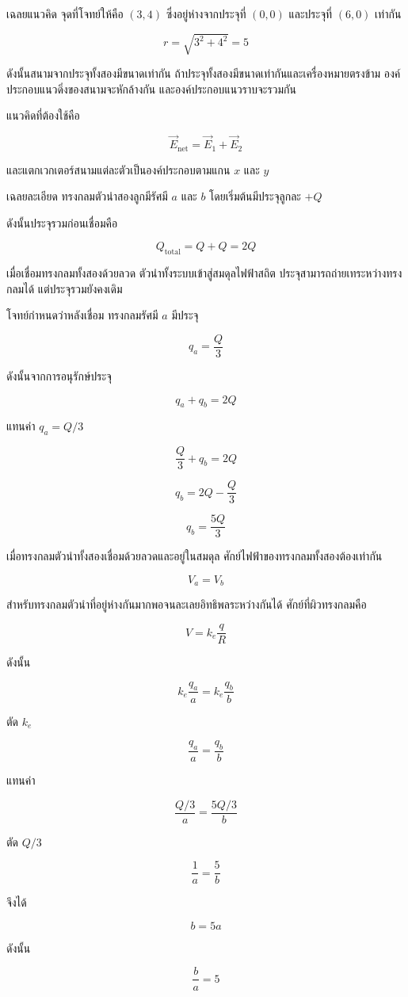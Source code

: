 \begin{examplebox}{เฉลยแนวคิด}
จุดที่โจทย์ให้คือ $(3,4)$ ซึ่งอยู่ห่างจากประจุที่ $(0,0)$ และประจุที่ $(6,0)$ เท่ากัน

\[
r=\sqrt{3^2+4^2}=5
\]

ดังนั้นสนามจากประจุทั้งสองมีขนาดเท่ากัน ถ้าประจุทั้งสองมีขนาดเท่ากันและเครื่องหมายตรงข้าม องค์ประกอบแนวดิ่งของสนามจะหักล้างกัน และองค์ประกอบแนวราบจะรวมกัน

แนวคิดที่ต้องใช้คือ

\[
\vec{E}_{\text{net}}=\vec{E}_1+\vec{E}_2
\]

และแตกเวกเตอร์สนามแต่ละตัวเป็นองค์ประกอบตามแกน $x$ และ $y$
\end{examplebox}

\begin{examplebox}{เฉลยละเอียด}
ทรงกลมตัวนำสองลูกมีรัศมี $a$ และ $b$ โดยเริ่มต้นมีประจุลูกละ $+Q$

ดังนั้นประจุรวมก่อนเชื่อมคือ

\[
Q_{\text{total}}=Q+Q=2Q
\]

เมื่อเชื่อมทรงกลมทั้งสองด้วยลวด ตัวนำทั้งระบบเข้าสู่สมดุลไฟฟ้าสถิต ประจุสามารถถ่ายเทระหว่างทรงกลมได้ แต่ประจุรวมยังคงเดิม

โจทย์กำหนดว่าหลังเชื่อม ทรงกลมรัศมี $a$ มีประจุ

\[
q_a=\frac{Q}{3}
\]

ดังนั้นจากการอนุรักษ์ประจุ

\[
q_a+q_b=2Q
\]

แทนค่า $q_a=Q/3$

\[
\frac{Q}{3}+q_b=2Q
\]

\[
q_b=2Q-\frac{Q}{3}
\]

\[
q_b=\frac{5Q}{3}
\]

เมื่อทรงกลมตัวนำทั้งสองเชื่อมด้วยลวดและอยู่ในสมดุล ศักย์ไฟฟ้าของทรงกลมทั้งสองต้องเท่ากัน

\[
V_a=V_b
\]

สำหรับทรงกลมตัวนำที่อยู่ห่างกันมากพอจนละเลยอิทธิพลระหว่างกันได้ ศักย์ที่ผิวทรงกลมคือ

\[
V=k_e\frac{q}{R}
\]

ดังนั้น

\[
k_e\frac{q_a}{a}
=
k_e\frac{q_b}{b}
\]

ตัด $k_e$

\[
\frac{q_a}{a}
=
\frac{q_b}{b}
\]

แทนค่า

\[
\frac{Q/3}{a}
=
\frac{5Q/3}{b}
\]

ตัด $Q/3$

\[
\frac{1}{a}
=
\frac{5}{b}
\]

จึงได้

\[
b=5a
\]

ดังนั้น

\[
\boxed{\frac{b}{a}=5}
\]
\end{examplebox}
